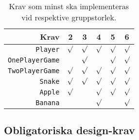 \begin{table}[H]
  \centering
  \caption{Krav som minst ska implementeras vid respektive gruppstorlek. \label{lab:snak:table-reqt}}

\begin{tabular}{r | c c c c c}
  Krav                   & 2       & 3       & 4       & 5       & 6 \\ \hline
  \texttt{Player}        & $\surd$ & $\surd$ & $\surd$ & $\surd$ & $\surd$ \\
  \texttt{OnePlayerGame} &         & $\surd$ &         & $\surd$ & $\surd$ \\
  \texttt{TwoPlayerGame} & $\surd$ & $\surd$ & $\surd$ & $\surd$ & $\surd$ \\
  \texttt{Snake}         & $\surd$ & $\surd$ & $\surd$ & $\surd$ & $\surd$ \\
  \texttt{Apple}         & $\surd$ &         & $\surd$ & $\surd$ & $\surd$ \\
  \texttt{Banana}        &         &         & $\surd$ &         & $\surd$ \\
\end{tabular}
\end{table}

\subsection{Obligatoriska design-krav}

